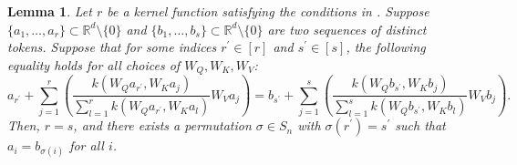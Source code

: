 \documentclass{article}
\newtheorem{lemma}{Lemma}
\begin{document}




\begin{lemma}
    \label{lem:equal_atten}
    Let $r$ be a kernel function satisfying the conditions in .
    Suppose $\{a_1, \dots, a_r\}\subset \mathbb{R}^d\setminus \{0\}$ and $\{b_1,\dots, b_s\}\subset \mathbb{R}^d\setminus \{0\}$ are two sequences of distinct tokens. Suppose that for some indices $r^\prime\in [r]$ and $s^\prime\in [s]$, the following equality holds for all choices of $W_Q, W_K, W_V$:
    \begin{equation}
        \label{eq:lem_equal_atten}
        a_{r^\prime}+\sum_{j=1}^r\left(\frac{ k(W_Q a_{r^\prime}, W_K a_j)}{\sum_{l=1}^r k(W_Q a_{r^\prime}, W_K a_l)} W_V a_j\right) =
        b_{s^\prime}+\sum_{j=1}^s\left(\frac{ k(W_Q b_{s^\prime}, W_K b_j)}{\sum_{l=1}^s k(W_Q b_{s^\prime}, W_K b_l)} W_V b_j\right).
    \end{equation}
    Then, $r=s$, and there exists a permutation $\sigma\in{S}_n$ with $\sigma(r^\prime)=s^\prime$ such that $a_i=b_{\sigma(i)}$ for all $i$.
\end{lemma}
\end{document}
